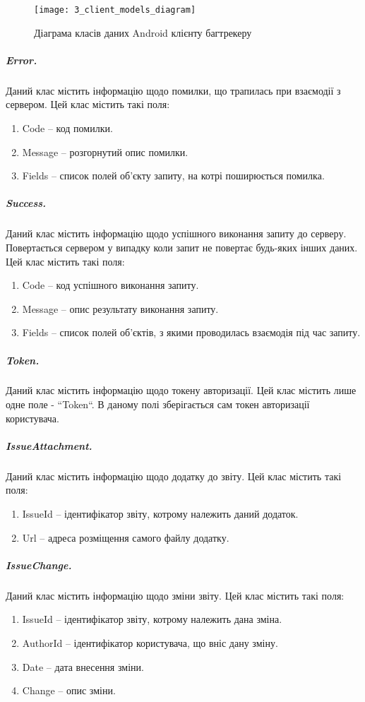 \documentclass[../main.tex]{subfiles}
\begin{document}
		\begin{figure}[H]
			\centering
			\texttt{[image: 3\_client\_models\_diagram]}
			\caption{Діаграма класів даних Android клієнту багтрекеру}
			\label{client_models}
		\end{figure}
		
		\subparagraph{Error.}
			Даний клас містить інформацію щодо помилки, що трапилась при взаємодії з сервером. Цей клас містить такі поля:
			\begin{enumerate}
				\item Code -- код помилки.
				\item Message -- розгорнутий опис помилки.
				\item Fields -- список полей об'єкту запиту, на котрі поширюється помилка.
			\end{enumerate}
		
		\subparagraph{Success.}
			Даний клас містить інформацію щодо успішного виконання запиту до серверу. Повертається сервером у випадку коли запит не повертає будь-яких інших даних. Цей клас містить такі поля:
			\begin{enumerate}
				\item Code -- код успішного виконання запиту.
				\item Message -- опис результату виконання запиту.
				\item Fields -- список полей об'єктів, з якими проводилась взаємодія під час запиту.
			\end{enumerate}

		\subparagraph{Token.}
			Даний клас містить інформацію щодо токену авторизації. Цей клас містить лише одне поле - ``Token``. В даному полі зберігається сам токен авторизації користувача.

		\subparagraph{IssueAttachment.}
			Даний клас містить інформацію щодо додатку до звіту. Цей клас містить такі поля:
			\begin{enumerate}
				\item IssueId -- ідентифікатор звіту, котрому належить даний додаток.
				\item Url -- адреса розміщення самого файлу додатку.
			\end{enumerate}
		
		\subparagraph{IssueChange.}
			Даний клас містить інформацію щодо зміни звіту. Цей клас містить такі поля:
			\begin{enumerate}
				\item IssueId -- ідентифікатор звіту, котрому належить дана зміна.
				\item AuthorId -- ідентифікатор користувача, що вніс дану зміну.
				\item Date -- дата внесення зміни.
				\item Change -- опис зміни.
			\end{enumerate}
		
\end{document}
